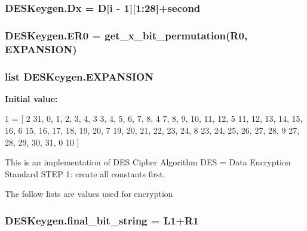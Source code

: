 \subsubsection[{\texorpdfstring{Dx}{Dx}}]{\setlength{\rightskip}{0pt plus 5cm}D\+E\+S\+Keygen.\+Dx = {\bf D}\mbox{[}i -\/ 1\mbox{]}\mbox{[}1\+:28\mbox{]}+{\bf second}}\hypertarget{namespaceDESKeygen_aea3b6f6658e81a15d8e287c4f3667715}{}\label{namespaceDESKeygen_aea3b6f6658e81a15d8e287c4f3667715}
\subsubsection[{\texorpdfstring{E\+R0}{ER0}}]{\setlength{\rightskip}{0pt plus 5cm}D\+E\+S\+Keygen.\+E\+R0 = {\bf get\+\_\+x\+\_\+bit\+\_\+permutation}({\bf R0}, {\bf E\+X\+P\+A\+N\+S\+I\+ON})}\hypertarget{namespaceDESKeygen_a37a1e1e67c012d08675df6566f98965b}{}\label{namespaceDESKeygen_a37a1e1e67c012d08675df6566f98965b}
\subsubsection[{\texorpdfstring{E\+X\+P\+A\+N\+S\+I\+ON}{EXPANSION}}]{\setlength{\rightskip}{0pt plus 5cm}list D\+E\+S\+Keygen.\+E\+X\+P\+A\+N\+S\+I\+ON}\hypertarget{namespaceDESKeygen_af93868fb830bf819ba3a974f70268bc3}{}\label{namespaceDESKeygen_af93868fb830bf819ba3a974f70268bc3}
{\bfseries Initial value\+:}
\begin{DoxyCode}
1 = [
2     31, 0, 1, 2, 3, 4,
3     3, 4, 5, 6, 7, 8,
4     7, 8, 9, 10, 11, 12,
5     11, 12, 13, 14, 15, 16,
6     15, 16, 17, 18, 19, 20,
7     19, 20, 21, 22, 23, 24,
8     23, 24, 25, 26, 27, 28,
9     27, 28, 29, 30, 31, 0
10 ]
\end{DoxyCode}


This is an implementation of D\+ES Cipher Algorithm D\+ES = Data Encryption Standard S\+T\+EP 1\+: create all constants first. 

The follow lists are values used for encryption 
\subsubsection[{\texorpdfstring{final\+\_\+bit\+\_\+string}{final_bit_string}}]{\setlength{\rightskip}{0pt plus 5cm}D\+E\+S\+Keygen.\+final\+\_\+bit\+\_\+string = {\bf L1}+{\bf R1}}\hypertarget{namespaceDESKeygen_ad33c4097fff60ff4ff6a9ad24fc3d425}{}\label{namespaceDESKeygen_ad33c4097fff60ff4ff6a9ad24fc3d425}
